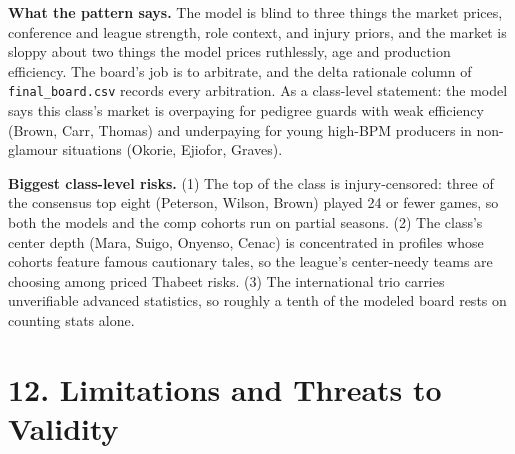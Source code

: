 \documentclass[
  10pt,
]{article}
\begin{document}
\textbf{What the pattern says.} The model is blind to three things the market
prices, conference and league strength, role context, and injury priors, and the
market is sloppy about two things the model prices ruthlessly, age and
production efficiency. The board's job is to arbitrate, and the delta rationale
column of \texttt{final\_board.csv} records every arbitration. As a class-level
statement: the model says this class's market is overpaying for pedigree guards
with weak efficiency (Brown, Carr, Thomas) and underpaying for young high-BPM
producers in non-glamour situations (Okorie, Ejiofor, Graves).

\textbf{Biggest class-level risks.} (1) The top of the class is injury-censored:
three of the consensus top eight (Peterson, Wilson, Brown) played 24 or fewer
games, so both the models and the comp cohorts run on partial seasons. (2) The
class's center depth (Mara, Suigo, Onyenso, Cenac) is concentrated in profiles
whose cohorts feature famous cautionary tales, so the league's center-needy
teams are choosing among priced Thabeet risks. (3) The international trio
carries unverifiable advanced statistics, so roughly a tenth of the modeled
board rests on counting stats alone.

\section{12. Limitations and Threats to
Validity}\label{limitations-and-threats-to-validity}
\end{document}
